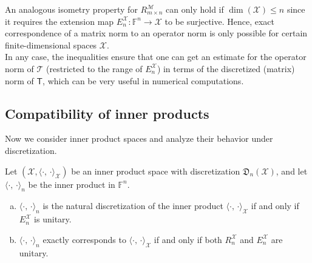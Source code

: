 \documentclass[a4paper]{paper}
\newcommand{\Discr}{\mathfrak{D}}
\newcommand{\Spc}[1]{\mathscr{#1}}
\newcommand{\Field}{\mathbb{F}}
\newcommand{\Op}[1]{\mathcal{#1}}
\newcommand{\DiscOp}[1]{\mathsf{#1}}
\newcommand*{\EXT}[2]{\ensuremath{E_{#1}^{#2}}}
\newcommand*{\REST}[2]{\ensuremath{R_{#1}^{#2}}}
\newcommand*{\RnX}{\ensuremath{\REST{n}{\Spc{X}}}}
\newcommand*{\EnX}{\ensuremath{\EXT{n}{\Spc{X}}}}
\DeclareMathOperator{\DIM}{dim}
\newcommand*{\INNER}[2]{\ensuremath{\langle #1,\,#2\rangle}}
\begin{document}
\begin{remark}
 An analogous isometry property for $\REST{m\times n}{\Spc{M}}$ can only hold if $\DIM(\Spc{X}) \leq n$ 
 since it requires the extension map $\EnX \colon \Field^n \to \Spc{X}$ to be surjective. Hence, exact correspondence 
 of a matrix norm to an operator norm is only possible for certain finite-dimensional spaces $\Spc{X}$.\\
 In any case, the inequalities ensure that one can get an estimate for the operator norm of $\Op{T}$ (restricted to the 
 range of $\EnX$) in terms of the discretized (matrix) norm of $\DiscOp{T}$, which can be very useful in numerical 
 computations.
\end{remark}


\subsection{Compatibility of inner products}

Now we consider inner product spaces and analyze their behavior under discretization.

\begin{lemma}
 \label{lemma:inner_prod_compatibility}
 Let $(\Spc{X}, \INNER{\cdot}{\cdot}_{\Spc{X}})$ be an inner product space with discretization $\Discr_n(\Spc{X})$, and 
 let $\INNER{\cdot}{\cdot}_n$ be the inner product in $\Field^n$.
 \begin{enumerate}[(a)]
  \item \label{lemma:inner_prod_compatibility:a_natural}
  $\INNER{\cdot}{\cdot}_n$ is the natural discretization of the inner product $\INNER{\cdot}{\cdot}_{\Spc{X}}$ if and 
  only if $\EnX$ is unitary.
  
  \item \label{lemma:inner_prod_compatibility:b_correspondence}
  $\INNER{\cdot}{\cdot}_n$ exactly corresponds to $\INNER{\cdot}{\cdot}_{\Spc{X}}$ if and only if both $\RnX$ and 
  $\EnX$ are unitary.
 \end{enumerate}
\end{lemma}
\end{document}

